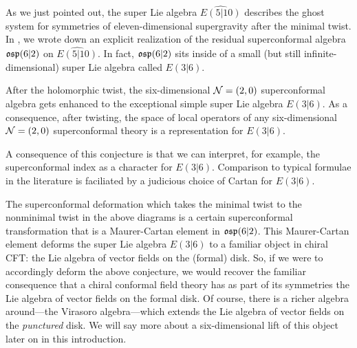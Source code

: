 As we just pointed out, the super Lie algebra $\widehat {E(5|10)}$ describes the ghost system for symmetries of eleven-dimensional supergravity after the minimal twist.
In \cite{RSW}, we wrote down an explicit realization of the residual superconformal algebra $\mathfrak{osp}(6|2)$ on $\widehat {E(5|10)}$.
In fact, $\mathfrak{osp}(6|2)$ sits inside of a small (but still infinite-dimensional) super Lie algebra called $E(3|6)$. 

\begin{conj}
After the holomorphic twist, the six-dimensional $\mathcal N = (2,0) $ superconformal algebra gets enhanced to the exceptional simple super Lie algebra $E(3|6)$.
As a consequence, after twisting, the space of local operators of any six-dimensional $\mathcal N=(2,0)$ superconformal theory is a representation for $E(3|6)$.
\end{conj}

A consequence of this conjecture is that we can interpret, for example, the superconformal index as a character for $E(3|6)$. Comparison to typical formulae in the literature is faciliated by a judicious choice of Cartan for $E(3|6)$.

The superconformal deformation which takes the minimal twist to the nonminimal twist in the above diagrams is a certain superconformal transformation that is a Maurer-Cartan element in $\mathfrak{osp}(6|2)$. This Maurer-Cartan element deforms the super Lie algebra $E(3|6)$ to a familiar object in chiral CFT: the Lie algebra of vector fields on the (formal) disk.
So, if we were to accordingly deform the above conjecture, we would recover the familiar consequence that a chiral conformal field theory has as part of its symmetries the Lie algebra of vector fields on the formal disk.
Of course, there is a richer algebra around---the Virasoro algebra---which extends the Lie algebra of vector fields on the {\em punctured} disk. 
We will say more about a six-dimensional lift of this object later on in this introduction.

